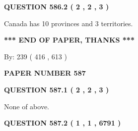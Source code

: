 \documentclass[12pt]{article}
\begin{document}
\vspace{0.2in}
  
{\textbf{\Large{QUESTION
586.2 
 ( 2 , 2 , 3 )
}}}
  
  
 
 
\noindent{}
 
 
Canada has 10  provinces and 3 territories.
 
 
 
 
   
   
 \vspace{0.2in}
 
   
   
   
   
\vspace{1.0in} 
{\textbf{\large{ *** END OF PAPER, THANKS *** }}} 
   
   
\hspace{1.0in} By: 
 239 ( 416 ,  613 )
   
   
   
   
\newpage 
\setcounter{page}{ 
   587001 } 
   
   
   
   
 {\textbf{ \Large{ PAPER NUMBER  587  }}}
   
   
\vspace{0.2in}
   
   
   
   
   
   
 \vspace{0.2in}
 
 
 
 
   
   
  
\vspace{0.2in}
  
{\textbf{\Large{QUESTION
587.1 
 ( 2 , 2 , 3 )
}}}
  
  
 
 
\noindent{}
 
 
 None of above.
 
 
 
 
  
\vspace{0.2in}
  
{\textbf{\Large{QUESTION
587.2 
 ( 1 , 1 , 6791 )
}}}
  
\end{document}
